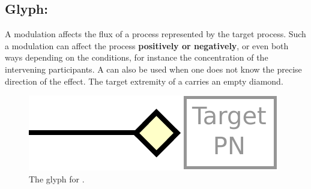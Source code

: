 \subsection{Glyph: }\label{sec:modulation}

A modulation affects the flux of a process represented by the target process. Such a modulation can affect the
process \textbf{positively or negatively}, or even both ways depending on the conditions, for instance the concentration of the intervening
participants. A  can also be used when one does not know the precise direction of the effect. The target extremity of a  carries an empty diamond.

\begin{figure}[H]
  \centering
  \includegraphics[scale = 0.5]{images/modulation}
  \caption{The \PD glyph for .}
  \label{fig:modulation}
\end{figure}

